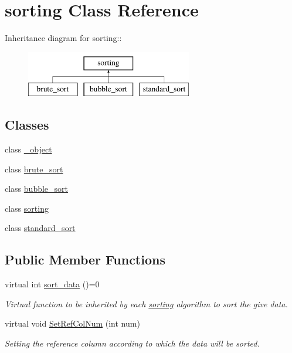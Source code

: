 \hypertarget{classsorting}{
\section{sorting Class Reference}
\label{df/d42/classsorting}
}
Inheritance diagram for sorting::\begin{figure}[H]
\begin{center}
\leavevmode
\includegraphics[height=2cm]{df/d42/classsorting}
\end{center}
\end{figure}
\subsection*{Classes}
\begin{DoxyCompactItemize}
\item 
class \hyperlink{classsorting_1_1__object}{\_\-object}
\item 
class \hyperlink{classsorting_1_1brute__sort}{brute\_\-sort}
\item 
class \hyperlink{classsorting_1_1bubble__sort}{bubble\_\-sort}
\item 
class \hyperlink{classsorting_1_1sorting}{sorting}
\item 
class \hyperlink{classsorting_1_1standard__sort}{standard\_\-sort}
\end{DoxyCompactItemize}
\subsection*{Public Member Functions}
\begin{DoxyCompactItemize}
\item 
\hypertarget{classsorting_a94c4b729732743299f3dcd2505312381}{
virtual int \hyperlink{classsorting_a94c4b729732743299f3dcd2505312381}{sort\_\-data} ()=0}
\label{df/d42/classsorting_a94c4b729732743299f3dcd2505312381}

\begin{DoxyCompactList}\small\item\em Virtual function to be inherited by each \hyperlink{classsorting}{sorting} algorithm to sort the give data. \item\end{DoxyCompactList}\item 
\hypertarget{classsorting_aee6e7f2f0ea31873c500e0692e4fc00c}{
virtual void \hyperlink{classsorting_aee6e7f2f0ea31873c500e0692e4fc00c}{SetRefColNum} (int num)}
\label{df/d42/classsorting_aee6e7f2f0ea31873c500e0692e4fc00c}

\begin{DoxyCompactList}\small\item\em Setting the reference column according to which the data will be sorted. \item\end{DoxyCompactList}\end{DoxyCompactItemize}
